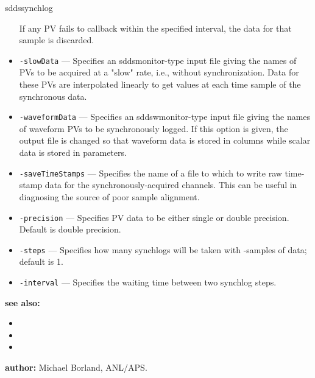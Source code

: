\begin{sddsprog}{sddssynchlog}
\begin{itemize}
                If any PV fails to callback within the specified interval, the data for
                that sample is discarded.
  \item {\tt -slowData} --- Specifies an sddsmonitor-type input file giving the names of PVs to be
                acquired at a "slow" rate, i.e., without synchronization.  Data for these PVs
                are interpolated linearly to get values at each time sample of the synchronous
                data.
  \item {\tt -waveformData} --- Specifies an sddswmonitor-type input file giving the names of waveform PVs to
                be synchronously logged.  If this option is given, the output file is changed
                so that waveform data is stored in columns while scalar data is stored in
                parameters.
  \item {\tt -saveTimeStamps} --- Specifies the name of a file to which to write raw time-stamp data for the
                synchronously-acquired channels.  This can be useful in diagnosing the source
                of poor sample alignment.
  \item {\tt -precision} --- Specifies PV data to be either single or double precision.  Default is double precision.
  \item {\tt -steps} --- Specifies how many synchlogs will be taken with -samples of data; default is 1.
  \item {\tt -interval} --- Specifies the waiting time between two synchlog steps.
\end{itemize}

\item \textbf{see also:}
\begin{itemize}
  \item {}
  \item {}
  \item {}
\end{itemize}
\item \textbf{author:} Michael Borland, ANL/APS.
\end{sddsprog}
